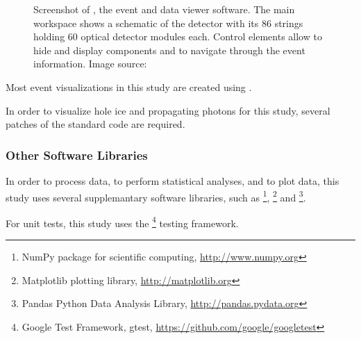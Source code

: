 \begin{figure}
  \caption{Screenshot of \steamshovel, the \icecube event and data viewer software. The main workspace shows a schematic of the \icecube detector with its 86 strings holding 60 optical detector modules each. Control elements allow to hide and display components and to navigate through the event information. Image source: \cite{steamshoveldocumentation}}
  \label{fig:steamshovel}
\end{figure}

Most event visualizations in this study are created using \steamshovel.

In order to visualize hole ice and propagating photons for this study, several patches of the standard \steamshovel code are required.



\subsubsection{Other Software Libraries}

In order to process data, to perform statistical analyses, and to plot data, this study uses several supplemantary software libraries, such as \footnote{NumPy package for scientific computing, \url{http://www.numpy.org}}, \footnote{Matplotlib plotting library, \url{http://matplotlib.org}} and \footnote{Pandas Python Data Analysis Library, \url{http://pandas.pydata.org}}.


For unit tests, this study uses the \footnote{Google Test Framework, gtest, \url{https://github.com/google/googletest}} testing framework.

